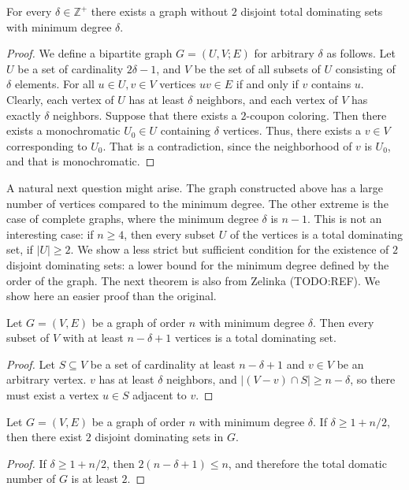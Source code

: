 \begin{thm}
  For every $\delta \in \mathbb{Z}^+$ there exists a graph without $2$
  disjoint total dominating sets with minimum degree $\delta$.
\end{thm}
\begin{proof}
  We define a bipartite graph $G = (U, V ; E)$ for arbitrary $\delta$ as follows.
  Let $U$ be a set of cardinality $2\delta - 1$, and $V$ be the set of all subsets of
  $U$ consisting of $\delta$ elements. For all $ u \in U, v \in V$ vertices $uv \in E$
  if and only if $v$ contains $u$. Clearly, each vertex of $U$ has at least $\delta$
  neighbors, and each vertex of $V$ has exactly $\delta$ neighbors. Suppose that
  there exists a $2$-coupon coloring. Then there exists a monochromatic $U_0 \in U$
  containing $\delta$ vertices. Thus, there exists a $v \in V$ corresponding to $U_0$.
  That is a contradiction, since the neighborhood of $v$ is $U_0$, and that is monochromatic.
\end{proof}

A natural next question might arise. The graph constructed above has a large number
of vertices compared to the minimum degree. The other extreme is the case of
complete graphs, where the minimum degree $\delta$ is $n - 1$. This is not an interesting case:
if $n \ge 4$, then every subset $U$ of the vertices is a total dominating set, if $|U| \ge 2$.
We show a less strict but sufficient condition for the existence of $2$ disjoint dominating sets:
a lower bound for the minimum degree defined by the order of the graph.
The next theorem is also from Zelinka (TODO:REF). We show here an easier proof than
the original.

\begin{claim}
  Let $G = (V,E)$ be a graph of order $n$ with minimum degree $\delta$. Then every subset
  of $V$ with at least $n - \delta + 1$ vertices is a total dominating set.
\end{claim}
\begin{proof}
  Let $S \subseteq V$ be a set of cardinality at least $n - \delta + 1$ and $v \in V$ be
  an arbitrary vertex. $v$ has at least $\delta$ neighbors, and $|(V - v) \cap S| \ge
  n - \delta$, so there must exist a vertex $u \in S$ adjacent to $v$.
\end{proof}

\begin{cor}
  Let $G = (V,E)$ be a graph of order $n$ with minimum degree $\delta$. If $\delta \ge 1 + n/2$,
  then there exist $2$ disjoint dominating sets in $G$.
\end{cor}
\begin{proof}
  If $\delta \ge 1 + n/2$, then $2(n - \delta + 1) \le n$, and therefore the total
  domatic number of $G$ is at least $2$.
\end{proof}

